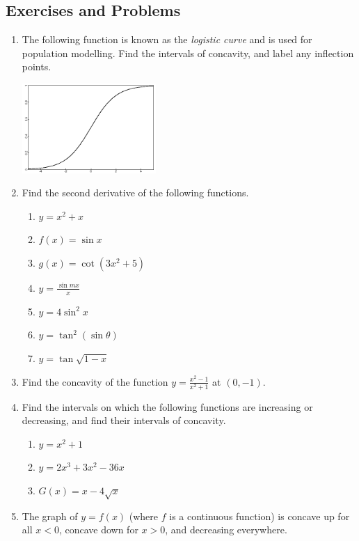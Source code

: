 \subsection{Exercises and Problems}
\begin{enumerate}
  \item The following function is known as the \textit{logistic curve} and is used for population modelling. Find the intervals of
        concavity, and label any inflection points.
        \begin{center}
          \includegraphics[width=0.4\textwidth]{logistic}
        \end{center}
  \item Find the second derivative of the following functions.
    \begin{enumerate}
      \item $ y = x^2 + x $
      \item $ f(x) = \sin x $
      \item $ g(x) = \cot(3x^2 + 5) $
      \item $ y = \frac{\sin mx}{x} $
      \item $ y = 4 \sin^2 x $
      \item $ y = \tan^2 (\sin \theta) $
      \item $ y = \tan \sqrt{1 - x} $
    \end{enumerate}
  \item Find the concavity of the function $ y = \frac{x^2 - 1}{x^2 + 1} $ at $ (0, -1) $.
  \item Find the intervals on which the following functions are increasing or decreasing, and
        find their intervals of concavity.
    \begin{enumerate}
      \item $ y = x^2 + 1 $
      \item $ y = 2x^3+ 3x^2 - 36x $
      \item $ G(x) = x - 4\sqrt{x} $
    \end{enumerate}
  \item The graph of $ y = f(x) $ (where $ f $ is a continuous function) is concave up for all $ x < 0 $, concave down for $ x > 0 $, and decreasing everywhere.

\end{enumerate}
